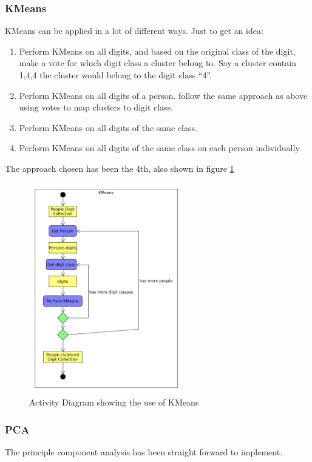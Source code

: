 \documentclass[report]{subfiles}
\begin{document}
\subsubsection{KMeans}
KMeans can be applied in a lot of different ways.
Just to get an idea:
\begin{enumerate}
\item Perform KMeans on all digits, and based on the original class of the digit, make a vote for which digit class a cluster belong to. Say a cluster contain {1,4,4} the cluster would belong to the digit class ``4''.
\item Perform KMeans on all digits of a person. follow the same approach as above using votes to map clusters to digit class.
\item Perform KMeans on all digits of the same class.
\item Perform KMeans on all digits of the same class on each person individually
\end{enumerate}

The approach chosen has been the 4th, also shown in figure \ref{fig:kmeans}

\begin{figure}[H]
  \centering
  \includegraphics[width=0.6\textwidth]{UML/kmeans}
  \caption{Activity Diagram showing the use of KMeans}
  \label{fig:kmeans}
\end{figure}

\subsubsection{PCA}
The principle component analysis has been straight forward to implement.
\end{document}

